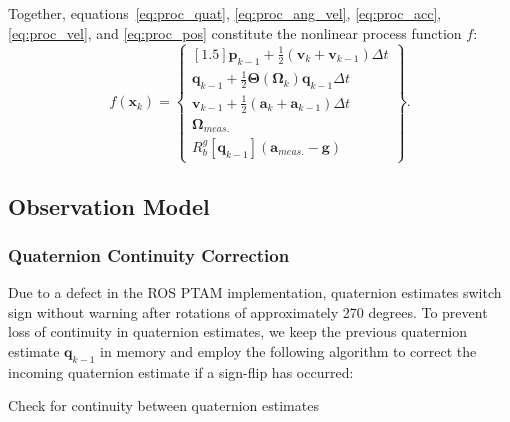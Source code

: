 Together, equations~\ref{eq:proc_quat}, \ref{eq:proc_ang_vel}, \ref{eq:proc_acc}, \ref{eq:proc_vel}, and \ref{eq:proc_pos} constitute the nonlinear process function $f$:
%
\begin{equation}
f \left( \mathbf{x}_{k} \right) = 
\begin{Bmatrix}[1.5]
   \mathbf{p}_{k-1} + \frac{1}{2} \left( \mathbf{v}_{k} + \mathbf{v}_{k-1} \right) \Delta t \\
   \mathbf{q}_{k-1} + \frac{1}{2} \mathbf{\Theta} \left( \bm{\Omega}_{k} \right) \mathbf{q}_{k-1} \Delta t \\
   \mathbf{v}_{k-1} + \frac{1}{2} \left( \mathbf{a}_{k} + \mathbf{a}_{k-1} \right) \Delta t \\
   \bm{\Omega}_{meas.} \\
   R^{g}_{b} \left[ \mathbf{q}_{k-1} \right] \left( \mathbf{a}_{meas.} - \mathbf{g} \right)
\end{Bmatrix} .
\end{equation}

\subsection{Observation Model} \label{Observation_Model}

\subsubsection{Quaternion Continuity Correction}

Due to a defect in the ROS PTAM implementation, quaternion estimates switch sign without warning after rotations of approximately 270 degrees. To prevent loss of continuity in quaternion estimates, we keep the previous quaternion estimate $\mathbf{q}_{k-1}$ in memory and employ the following algorithm to correct the incoming quaternion estimate if a sign-flip has occurred:

\begin{algorithm}
  \caption{Check for continuity between quaternion estimates}
    \label{alg:checkQuatContinuity}
\end{algorithm}

